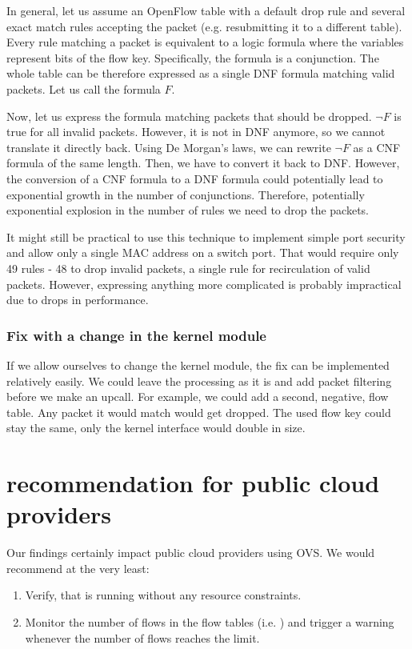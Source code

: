 In general, let us assume an OpenFlow table with a default drop rule and several exact match rules accepting the packet (e.g. resubmitting it to a different table). Every rule matching a packet is equivalent to a logic formula where the variables represent bits of the flow key. Specifically, the formula is a conjunction. The whole table can be therefore expressed as a single DNF formula matching valid packets. Let us call the formula $F$.

Now, let us express the formula matching packets that should be dropped. $\neg F$ is true for all invalid packets. However, it is not in DNF anymore, so we cannot translate it directly back. Using De Morgan's laws, we can rewrite $\neg F$ as a CNF formula of the same length. Then, we have to convert it back to DNF. However, the conversion of a CNF formula to a DNF formula could potentially lead to exponential growth in the number of conjunctions. Therefore, potentially exponential explosion in the number of rules we need to drop the packets.

It might still be practical to use this technique to implement simple port security and allow only a single MAC address on a switch port. That would require only 49 rules - 48 to drop invalid packets, a single rule for recirculation of valid packets. However, expressing anything more complicated is probably impractical due to drops in performance.

\subsubsection{Fix with a change in the kernel module}

If we allow ourselves to change the kernel module, the fix can be implemented relatively easily. We could leave the processing as it is and add packet filtering before we make an upcall. For example, we could add a second, negative, flow table. Any packet it would match would get dropped. The used flow key could stay the same, only the kernel interface would double in size.


\section{recommendation for public cloud providers}

Our findings certainly impact public cloud providers using OVS. We would recommend at the very least:

\begin{enumerate}
    \item Verify, that  is running without any resource constraints.
    \item Monitor the number of flows in the flow tables (i.e. ) and trigger a warning whenever the number of flows reaches the limit.
\end{enumerate}

